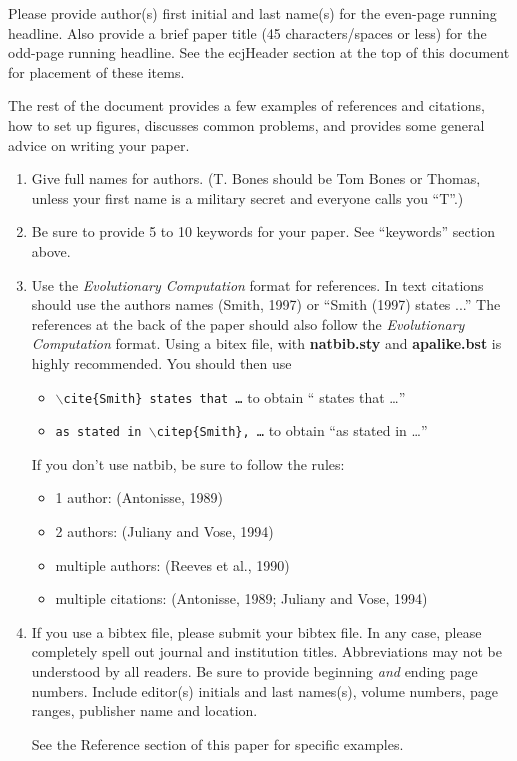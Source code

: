 \documentclass[twoside]{article}
\begin{document}
Please provide author(s) first initial and last name(s) for the even-page 
running headline. Also provide a brief paper title (45 characters/spaces or 
less) for the odd-page running headline.  See the ecjHeader section at the 
top of this document for placement of these items.

The rest of the document provides a few examples of references and 
citations, how to set up figures, discusses common problems, and provides some
general advice on writing your paper.

\begin{enumerate} 
    
\item
Give full names for authors.  (T. Bones should be Tom Bones or Thomas, 
unless your first name is a military secret and everyone calls you ``T''.)  

\item
Be sure to provide 5 to 10 keywords for your paper.  See ``keywords'' 
section above.

\item
Use the {\em Evolutionary Computation} format for references. In text 
citations should use the authors names (Smith, 1997) or ``Smith (1997) 
states ...''   The references at the back of the paper should also follow 
the {\em Evolutionary Computation} format. Using a bitex file, with
{\bf natbib.sty} and {\bf  apalike.bst}  is highly recommended. You
should then use 
\begin{itemize}
\item {\tt $\backslash$cite\{Smith\} states that \ldots} to obtain ``\cite{Smith} states that \ldots''
\item {\tt as stated in  $\backslash$citep\{Smith\}, \ldots} to obtain ``as stated in \citep{Smith} \ldots''
\end{itemize}

If you don't use natbib, be sure to follow the rules:

\begin{itemize}
\item 1 author: (Antonisse, 1989)
\item 2 authors: (Juliany and Vose, 1994)
\item multiple authors: (Reeves et al., 1990)
\item multiple citations: (Antonisse, 1989; Juliany and Vose, 1994) 
\end{itemize}


\item
If you use a bibtex file, please submit your bibtex file. In any case,
please completely 
spell out journal and institution titles.  Abbreviations may not be 
understood by all readers. Be sure to provide beginning {\em and} ending 
page numbers. Include editor(s) initials and last names(s), volume numbers, 
page ranges, publisher name and location.

See the Reference section of this paper for specific examples.

\end{enumerate}
\end{document}
